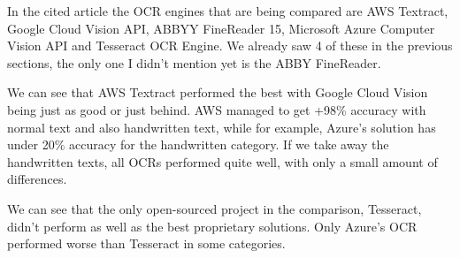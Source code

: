 \documentclass[
  digital,     %
  oneside,     %
  nosansbold,  %
  nocolorbold, %
  nolof,         %
  nolot,         %
]{fithesis4}
\begin{document}
In the cited article the OCR engines that are being compared are AWS Textract\cite{awstextract}, Google Cloud Vision API\cite{googleapi}, ABBYY FineReader 15, Microsoft Azure Computer Vision API\cite{azurevision} and Tesseract OCR Engine\cite{tesseract}. We already saw 4 of these in the previous sections, the only one I didn't mention yet is the ABBY FineReader.

We can see that AWS Textract performed the best with Google Cloud Vision being just as good or just behind. AWS managed to get +98\% accuracy with normal text and also handwritten text, while for example, Azure's solution has under 20\% accuracy for the handwritten category. If we take away the handwritten texts, all OCRs performed quite well, with only a small amount of differences.

We can see that the only open-sourced project in the comparison, Tesseract, didn't perform as well as the best proprietary solutions. Only Azure's OCR performed worse than Tesseract in some categories.
\end{document}
